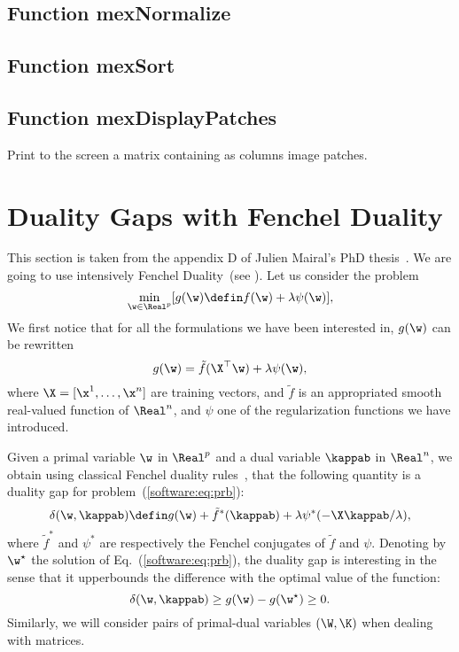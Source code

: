 \documentclass[a4paper, 11pt]{article}
\begin{document}
\subsection{Function mexNormalize}
{\footnotesize

}

\subsection{Function mexSort}
{\footnotesize

}

\subsection{Function mexDisplayPatches}
Print to the screen a matrix containing as columns image patches.

\appendix

\section{Duality Gaps with Fenchel Duality}\label{appendix}
This section is taken from the appendix D of Julien Mairal's PhD thesis~\cite{mairal11}.
We are going to use intensively Fenchel Duality~(see \cite{borwein}).
Let us consider the problem
\begin{equation}
   \min_{\w \in \Real^p} [g(\w) \defin f(\w) + \lambda\psi(\w)],\label{software:eq:prb}
\end{equation}
We first notice that for all the formulations we have been
interested in, $g(\w)$ can be rewritten
\begin{equation}
   g(\w) = \tilde{f}(\X^\top\w) + \lambda\psi(\w), \label{software:eq:prb2}
\end{equation}
where $\X=[\x^1,\ldots,\x^n]$ are training vectors, and $\tilde{f}$ is an
appropriated smooth real-valued function of $\Real^n$,
and $\psi$ one of the regularization functions we have introduced.

Given a primal variable $\w$ in $\Real^p$ and a dual variable $\kappab$ in
$\Real^n$, we obtain using classical Fenchel duality rules~\cite{borwein}, 
that the following quantity is a duality gap for problem~(\ref{software:eq:prb}):
\begin{displaymath}
   \delta(\w,\kappab) \defin g(\w) + \tilde{f}^\ast(\kappab) + \lambda\psi^\ast(-\X\kappab / \lambda),
\end{displaymath}
where $\tilde{f}^\ast$ and $\psi^\ast$ are respectively the Fenchel conjugates
of $\tilde{f}$ and $\psi$.  Denoting by $\w^\star$ the solution of
Eq.~(\ref{software:eq:prb}), the duality gap is interesting in the sense that
it upperbounds the difference with the optimal value of the function:
\begin{displaymath}
    \delta(\w,\kappab) \geq  g(\w)-g(\w^\star) \geq 0.
\end{displaymath}
Similarly, we will consider pairs of primal-dual variables $(\W,\K)$ when 
dealing with matrices.
\end{document}
